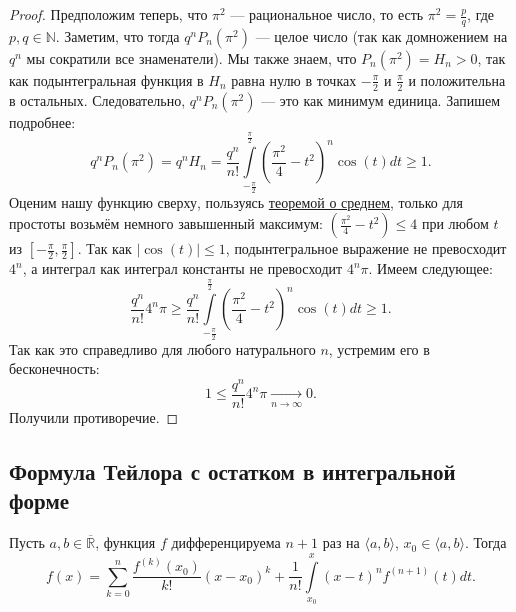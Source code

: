 \begin{proof}
	Предположим теперь, что \(\pi^2\) --- рациональное число, то есть \hbox{\(\pi^2 = \frac{p}{q}\)}, где \(p, q \in \mathbb{N}\). Заметим, что тогда \(q^n P_n(\pi^2)\) --- целое число (так как домножением на \(q^n\) мы сократили все знаменатели). Мы также знаем, что \(P_n(\pi^2) = H_n > 0\), так как подынтегральная функция в \(H_n\) равна нулю в точках \(-\frac\pi2\) и \(\frac\pi2\) и положительна в остальных. Следовательно, \(q^n P_n(\pi^2)\) --- это как минимум единица. Запишем подробнее: \[
		q^n P_n(\pi^2) = q^n H_n = \frac{q^n}{n!} \int\limits_{-\frac\pi2}^{\frac\pi2}
		\left(\frac{\pi^2}4 - t^2 \right)^n \cos(t) dt \geqslant 1.
	\] 
	Оценим нашу функцию сверху, пользуясь \hyperlink{t7_2}{теоремой о среднем}, только для простоты возьмём немного завышенный максимум: \(\left(\frac{\pi^2}4 - t^2 \right) \leqslant 4\) при любом \(t\) из \([-\frac\pi2, \frac\pi2]\). Так как \(|\cos(t)| \leqslant 1\), подынтегральное выражение не превосходит \(4^n\), а интеграл как интеграл константы не превосходит \(4^n \pi\). Имеем следующее: \[
		\frac{q^n}{n!} 4^n \pi \geqslant \frac{q^n}{n!} \int\limits_{-\frac\pi2}^{\frac\pi2}
		\left(\frac{\pi^2}4 - t^2 \right)^n \cos(t) dt \geqslant 1.
	\]
	Так как это справедливо для любого натурального \(n\), устремим его в бесконечность: \[
		1 \leqslant \frac{q^n}{n!} 4^n \pi \xrightarrow[n \to \infty]{} 0.
	\]
	Получили противоречие.
\end{proof}

\subsection{Формула Тейлора с остатком в интегральной форме}

\begin{theorem}
	Пусть \(a, b \in \overline{\mathbb{R}}\), функция \(f\) дифференцируема \(n + 1\) раз на \(\langle a, b \rangle\), \(x_0 \in \langle a, b \rangle\). Тогда \[
		f(x) = \sum_{k = 0}^n \frac{f^{(k)}(x_0)}{k!} (x - x_0)^k +
		\frac{1}{n!} \int\limits_{x_0}^x (x - t)^n f^{(n + 1)}(t) dt.
	\]
\end{theorem}

